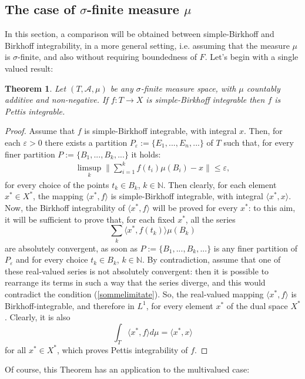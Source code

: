 \documentclass[11pt,a4paper,twoside]{amsart}
\newtheorem{theorem}{Theorem}[section]
\begin{document}
\subsection{The case of $\sigma$-finite measure $\mu$}\label{three.2}
 In this section, a comparison will be obtained between simple-Birkhoff and  
Birkhoff integrability, in a more general setting, i.e. assuming that the measure $\mu$ is $\sigma$-finite, and also without requiring
 boundedness of $F$.  
Let's begin with a single valued result:
\begin{theorem}\label{versopettis}
Let $(T,\mathcal{A},\mu)$ be any $\sigma$-finite measure space,
 with $\mu$ countably additive and non-negative. If $f:T\to X$ is simple-Birkhoff integrable then $f$ is Pettis integrable.
\end{theorem}
\begin{proof}
Assume that $f$ is simple-Birkhoff integrable, with integral $x$. Then, for each ${\varepsilon}>0$ there exists a partition $P_{\varepsilon}:=\{E_1,...,E_n,...\}$ of $T$ such that, for every finer partition $P:=\{B_1,...,B_k,...\}$ it holds:
\begin{eqnarray}\label{sommelimitate}
\limsup_k\|\sum_{i=1}^kf(t_i)\mu(B_i)-x\|\leq {\varepsilon},
\end{eqnarray}
for every choice of the points $t_k\in B_k$, $k\in \mathbb{N}$.
Then clearly, for each element $x^*\in X^*$, the mapping 
$\langle  x^*, f\rangle$ is simple-Birkhoff integrable, with integral $\langle x^*,x\rangle$.
\\
Now, the Birkhoff integrability of   $\langle x^*,f\rangle$ will be proved for every $x^*$: to this aim, it will be sufficient to prove that, for each fixed $x^*$, all the series $$\sum_k\langle x^*,f(t_k)\rangle\mu(B_k)$$
 are absolutely convergent, as soon as  $P:=\{B_1,...,B_k,...\}$ is any finer partition of $P_{\varepsilon}$ and for every choice $t_k\in B_k$, $k\in \mathbb{N}$. By contradiction, assume that one of these real-valued series is not absolutely convergent: then it is possible to rearrange its terms in such a way that the series diverge, and this would contradict the condition (\ref{sommelimitate}). 
So, the real-valued mapping $\langle x^*,f\rangle$ is Birkhoff-integrable, and therefore in $L^1$, for every element $x^*$ of the dual space $X^*$. Clearly, it is also
$$\int_T \langle x^*,f\rangle d\mu= \langle x^*,x\rangle$$
for all $x^*\in X^*$,
which proves Pettis integrability of $f$.
\end{proof}
Of course, this Theorem has an application to the multivalued case:
\end{document}
